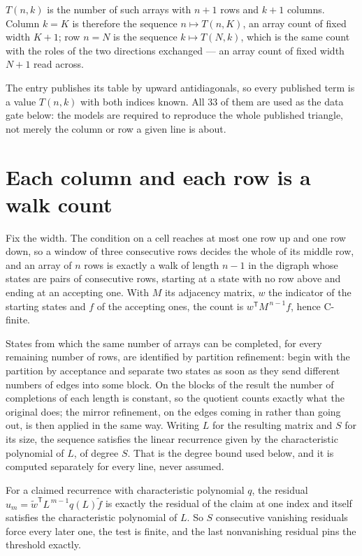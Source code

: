 \documentclass[11pt]{article}
\theoremstyle{definition}
\begin{document}
$T(n,k)$ is the number of such arrays with $n + 1$ rows and $k + 1$ columns. Column $k = K$ is therefore the sequence $n \mapsto T(n,K)$, an array count of fixed width $K + 1$; row $n = N$ is the sequence $k \mapsto T(N,k)$, which is the same count with the roles of the two directions exchanged --- an array count of fixed width $N + 1$ read across.

The entry publishes its table by upward antidiagonals, so every published term is a value $T(n,k)$ with both indices known. All 33 of them are used as the data gate below: the models are required to reproduce the whole published triangle, not merely the column or row a given line is about.

\section{Each column and each row is a walk count}

Fix the width. The condition on a cell reaches at most one row up and one row down, so a window of three consecutive rows decides the whole of its middle row, and an array of $n$ rows is exactly a walk of length $n-1$ in the digraph whose states are pairs of consecutive rows, starting at a state with no row above and ending at an accepting one. With $M$ its adjacency matrix, $w$ the indicator of the starting states and $f$ of the accepting ones, the count is $w^{\mathsf T}M^{\,n-1}f$, hence C-finite.

States from which the same number of arrays can be completed, for every remaining number of rows, are identified by partition refinement: begin with the partition by acceptance and separate two states as soon as they send different numbers of edges into some block. On the blocks of the result the number of completions of each length is constant, so the quotient counts exactly what the original does; the mirror refinement, on the edges coming in rather than going out, is then applied in the same way. Writing $L$ for the resulting matrix and $S$ for its size, the sequence satisfies the linear recurrence given by the characteristic polynomial of $L$, of degree $S$. That is the degree bound used below, and it is computed separately for every line, never assumed.

For a claimed recurrence with characteristic polynomial $q$, the residual $u_m = \tilde w^{\mathsf T}L^{\,m-1}q(L)\tilde f$ is exactly the residual of the claim at one index and itself satisfies the characteristic polynomial of $L$. So $S$ consecutive vanishing residuals force every later one, the test is finite, and the last nonvanishing residual pins the threshold exactly.
\end{document}
